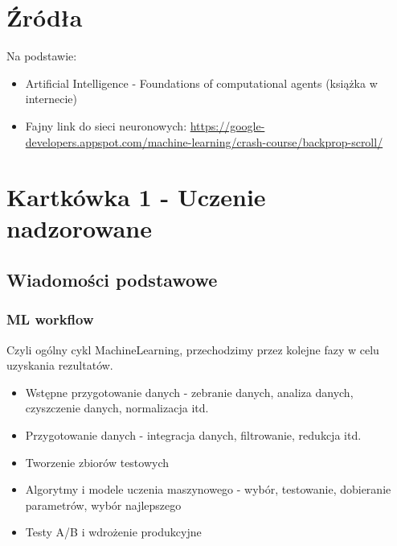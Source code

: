 \documentclass[a4paper,15pt]{article}
\begin{document}
\tableofcontents

\newpage
\section{Źródła}
Na podstawie:
\begin{itemize}
\item Artificial Intelligence - Foundations of computational agents (książka w internecie)
\item Fajny link do sieci neuronowych: \url{https://google-developers.appspot.com/machine-learning/crash-course/backprop-scroll/}
\end{itemize}

\section{Kartkówka 1 - Uczenie nadzorowane}

\subsection{Wiadomości podstawowe}

\subsubsection{ML workflow}
Czyli ogólny cykl MachineLearning, przechodzimy przez kolejne fazy w celu uzyskania rezultatów.
\begin{itemize}
\item Wstępne przygotowanie danych - zebranie danych, analiza danych, czyszczenie danych, normalizacja itd.
\item Przygotowanie danych - integracja danych, filtrowanie, redukcja itd.
\item Tworzenie zbiorów testowych
\item Algorytmy i modele uczenia maszynowego - wybór, testowanie, dobieranie parametrów, wybór najlepszego
\item Testy A/B i wdrożenie produkcyjne
\end{itemize}
\end{document}

